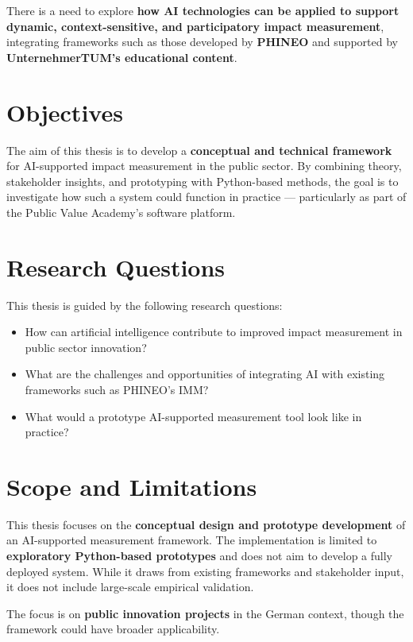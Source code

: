 There is a need to explore \textbf{how AI technologies can be applied to support dynamic, context-sensitive, and participatory impact measurement}, integrating frameworks such as those developed by \textbf{PHINEO} and supported by \textbf{UnternehmerTUM’s educational content}.

\section{Objectives}
The aim of this thesis is to develop a \textbf{conceptual and technical framework} for AI-supported impact measurement in the public sector. By combining theory, stakeholder insights, and prototyping with Python-based methods, the goal is to investigate how such a system could function in practice — particularly as part of the Public Value Academy’s software platform.

\section{Research Questions}

This thesis is guided by the following research questions:

\begin{itemize}
\item
How can artificial intelligence contribute to improved impact measurement in public sector innovation?
\item
What are the challenges and opportunities of integrating AI with existing frameworks such as PHINEO’s IMM?
\item
What would a prototype AI-supported measurement tool look like in practice?
\end{itemize}

\section{Scope and Limitations}

This thesis focuses on the \textbf{conceptual design and prototype development} of an AI-supported measurement framework. The implementation is limited to \textbf{exploratory Python-based prototypes} and does not aim to develop a fully deployed system. While it draws from existing frameworks and stakeholder input, it does not include large-scale empirical validation.

The focus is on \textbf{public innovation projects} in the German context, though the framework could have broader applicability.


